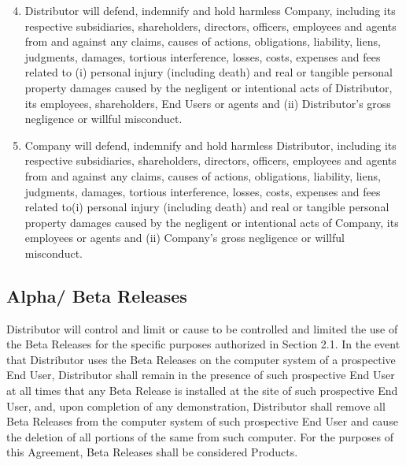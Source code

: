 \documentclass[letterpaper,10pt,openany,oneside,english]{sphinxmanual}
\begin{document}
\begin{enumerate}
\setcounter{enumi}{3}
\item {} 
Distributor will defend, indemnify and hold harmless Company, including its respective subsidiaries, shareholders, directors, officers, employees and agents from and against any claims, causes of actions, obligations, liability, liens, judgments, damages, tortious interference, losses, costs, expenses and fees related to (i) personal injury (including death) and real or tangible personal property damages caused by the negligent or intentional acts of Distributor, its employees, shareholders, End Users or agents and (ii) Distributor’s gross negligence or willful misconduct.

\item {} 
Company will defend, indemnify and hold harmless Distributor, including its respective subsidiaries, shareholders, directors, officers, employees and agents from and against any claims, causes of actions, obligations, liability, liens, judgments, damages, tortious interference, losses, costs, expenses and fees related to(i) personal injury (including death) and real or tangible personal property damages caused by the negligent or intentional acts of Company, its employees or agents and (ii) Company’s gross negligence or willful misconduct.

\end{enumerate}


\subsection{Alpha/ Beta Releases}
\label{\detokenize{distributionandpackaging:alpha-beta-releases}}
Distributor will control and limit or cause to be controlled and limited the use of the Beta Releases for the specific purposes authorized in Section 2.1. In the event that Distributor uses the Beta Releases on the computer system of a prospective End User, Distributor shall remain in the presence of such prospective End User at all times that any Beta Release is installed at the site of such prospective End User, and, upon completion of any demonstration, Distributor shall remove all Beta Releases from the computer system of such prospective End User and cause the deletion of all portions of the same from such computer. For the purposes of this Agreement, Beta Releases shall be considered Products.
\end{document}

